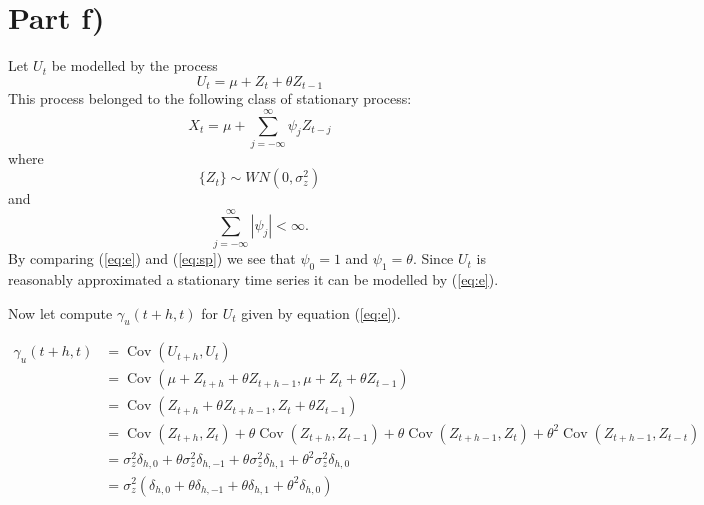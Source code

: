 \documentclass[11pt, oneside]{article}   	%
\newcommand{\Cov}{\operatorname{Cov}}
\begin{document}
\section{Part f)}
Let $U_{t}$ be modelled by the process 
\begin{equation}\label{eq:e}
U_{t} = \mu + Z_{t} + \theta Z_{t-1}
\end{equation}
This process belonged to the following class of stationary process:
\begin{equation}\label{eq:sp}
X_{t} = \mu + \sum_{j=-\infty}^{\infty}\psi_{j}Z_{t-j}
\end{equation}
where 
\begin{equation}
\{ Z_{t} \} \sim WN(0,\sigma_{z}^{2})
\end{equation}
and 
\begin{equation}
\sum_{j=-\infty}^{\infty}|\psi_{j}| < \infty.
\end{equation}
By comparing (\ref{eq:e}) and (\ref{eq:sp}) we see that $\psi_{0} = 1$ and   $\psi_{1} = \theta$. Since $U_{t}$ is reasonably approximated a stationary time series it can be modelled by (\ref{eq:e}).
\begin{flushleft}
Now let compute $\gamma_{u}(t+h,t)$ for $U_{t}$ given by equation (\ref{eq:e}).
\end{flushleft}

\begin{equation}
\begin{aligned}
\gamma_{u}(t+h,t) &= \Cov(U_{t+h},U_{t})\\ \nonumber
 &= \Cov(\mu + Z_{t+h} + \theta Z_{t+h-1},\mu + Z_{t} + \theta Z_{t-1})\\
 &=\Cov(Z_{t+h} + \theta Z_{t+h-1}, Z_{t} + \theta Z_{t-1}) \\
 &=\Cov(Z_{t+h},Z_{t})+\theta\Cov(Z_{t+h}, Z_{t-1})+\theta\Cov(Z_{t+h-1},Z_{t}) + \theta^{2}\Cov(Z_{t+h-1},Z_{t-t})\\
 &=\sigma_{z}^{2}\delta_{h,0}+\theta\sigma_{z}^{2}\delta_{h,-1}+\theta\sigma_{z}^{2}\delta_{h,1}+\theta^{2}\sigma_{z}^{2}\delta_{h,0}\\
 &=\sigma_{z}^{2}(\delta_{h,0}+\theta\delta_{h,-1}+\theta\delta_{h,1}+\theta^{2}\delta_{h,0}  )
\end{aligned}
\end{equation}
\end{document}
